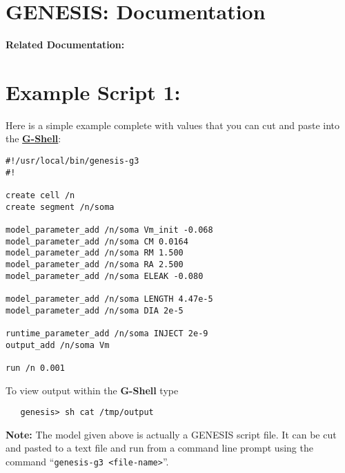 \documentclass[12pt]{article}
\begin{document}
\section*{GENESIS: Documentation}

{\bf Related Documentation:}

\section*{Example Script 1:}

Here is a simple example complete with values that you can cut and paste into the \href{../gshell/gshell.tex}{\bf G-Shell}:

\begin{verbatim}
#!/usr/local/bin/genesis-g3
#!

create cell /n
create segment /n/soma

model_parameter_add /n/soma Vm_init -0.068
model_parameter_add /n/soma CM 0.0164
model_parameter_add /n/soma RM 1.500
model_parameter_add /n/soma RA 2.500
model_parameter_add /n/soma ELEAK -0.080

model_parameter_add /n/soma LENGTH 4.47e-5
model_parameter_add /n/soma DIA 2e-5

runtime_parameter_add /n/soma INJECT 2e-9
output_add /n/soma Vm

run /n 0.001
\end{verbatim}
To view output within the {\bf G-Shell} type
\begin{verbatim}
   genesis> sh cat /tmp/output
\end{verbatim}
{\bf Note:} The model given above is actually a GENESIS script file. It can be cut and pasted to a text file and run from a command line prompt using the command ``{\tt genesis-g3 <file-name>}''.
\end{document}
